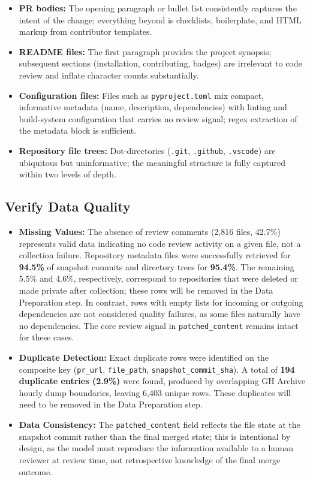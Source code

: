 \documentclass[11pt]{article}
\begin{document}
\begin{itemize}
    \item \textbf{PR bodies:} The opening paragraph or bullet list consistently captures the intent of the change; everything beyond is checklists, boilerplate, and HTML markup from contributor templates.
    \item \textbf{README files:} The first paragraph provides the project synopsis; subsequent sections (installation, contributing, badges) are irrelevant to code review and inflate character counts substantially.
    \item \textbf{Configuration files:} Files such as \texttt{pyproject.toml} mix compact, informative metadata (name, description, dependencies) with linting and build-system configuration that carries no review signal; regex extraction of the metadata block is sufficient.
    \item \textbf{Repository file trees:} Dot-directories (\texttt{.git}, \texttt{.github}, \texttt{.vscode}) are ubiquitous but uninformative; the meaningful structure is fully captured within two levels of depth.
\end{itemize}

\subsection*{Verify Data Quality}

\begin{itemize}
    \item \textbf{Missing Values:}
    The absence of review comments (2,816 files, 42.7\%) represents valid data indicating no code review activity on a given file, not a collection failure. Repository metadata files were successfully retrieved for \textbf{94.5\%} of snapshot commits and directory trees for \textbf{95.4\%}. The remaining 5.5\% and 4.6\%, respectively, correspond to repositories that were deleted or made private after collection; these rows will be removed in the Data Preparation step. In contrast, rows with empty lists for incoming or outgoing dependencies are not considered quality failures, as some files naturally have no dependencies. The core review signal in \texttt{patched\_content} remains intact for these cases.

    \item \textbf{Duplicate Detection:}
    Exact duplicate rows were identified on the composite key (\texttt{pr\_url}, \texttt{file\_path}, \texttt{snapshot\_commit\_sha}). A total of \textbf{194 duplicate entries (2.9\%)} were found, produced by overlapping GH Archive hourly dump boundaries, leaving 6,403 unique rows. These duplicates will need to be removed in the Data Preparation step.

    \item \textbf{Data Consistency:}
    The \texttt{patched\_content} field reflects the file state at the snapshot commit rather than the final merged state; this is intentional by design, as the model must reproduce the information available to a human reviewer at review time, not retrospective knowledge of the final merge outcome.
\end{itemize}
\end{document}
